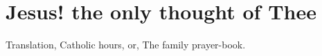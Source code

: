 \documentclass[oldfontcommands,a5paper,openany]{memoir}
\begin{document}
\autocompilegabc
\clearpage
\pagestyle{empty}

\section{Jesus! the only thought of Thee}


Translation, Catholic hours, or, The family prayer-book.
\end{document}
